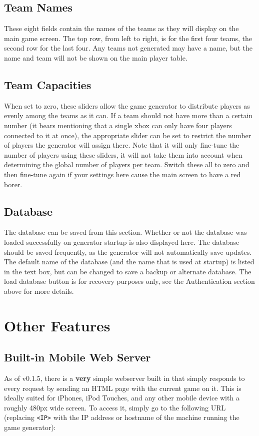 \documentclass[pdftex,10pt,a4paper]{report}
\begin{document}
\section{Team Names}
These eight fields contain the names of the teams as they will display on the main game screen.  The top row, from left to right, is for the first four teams, the second row for the last four.  Any teams not generated may have a name, but the name and team will not be shown on the main player table.

\section{Team Capacities}
When set to zero, these sliders allow the game generator to distribute players as evenly among the teams as it can.  If a team should not have more than a certain number (it bears mentioning that a single xbox can only have four players connected to it at once), the appropriate slider can be set to restrict the number of players the generator will assign there.  Note that it will only fine-tune the number of players using these sliders, it will not take them into account when determining the global number of players per team.  Switch these all to zero and then fine-tune again if your settings here cause the main screen to have a red borer.

\section{Database}
The database can be saved from this section.  Whether or not the database was loaded successfully on generator startup is also displayed here.  The database should be saved frequently, as the generator will not automatically save updates.  The default name of the database (and the name that is used at startup) is listed in the text box, but can be changed to save a backup or alternate database.  The load database button is for recovery purposes only, see the Authentication section above for more details.

\chapter{Other Features}
\section{Built-in Mobile Web Server}
As of v0.1.5, there is a \textbf{very} simple webserver built in that simply responds to every request by sending an HTML page with the current game on it.  This is ideally suited for iPhones, iPod Touches, and any other mobile device with a roughly 480px wide screen.  To access it, simply go to the following URL (replacing \verb+<IP>+ with the IP address or hostname of the machine running the game generator):
\end{document}
